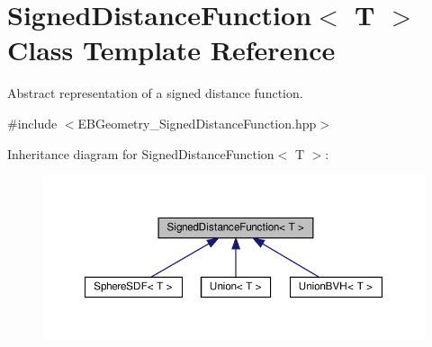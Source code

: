 \hypertarget{classSignedDistanceFunction}{}\section{Signed\+Distance\+Function$<$ T $>$ Class Template Reference}
\label{classSignedDistanceFunction}


Abstract representation of a signed distance function.  




{\ttfamily \#include $<$E\+B\+Geometry\+\_\+\+Signed\+Distance\+Function.\+hpp$>$}



Inheritance diagram for Signed\+Distance\+Function$<$ T $>$\+:\nopagebreak
\begin{figure}[H]
\begin{center}
\leavevmode
\includegraphics[width=350pt]{classSignedDistanceFunction__inherit__graph}
\end{center}
\end{figure}
